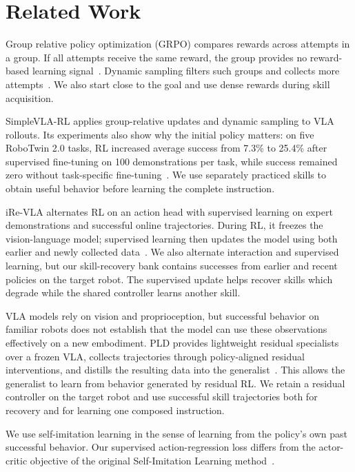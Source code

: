 \section{Related Work}\label{sec:related}
Group relative policy optimization (GRPO) compares rewards across attempts in a group. If all attempts receive the same reward, the group provides no reward-based learning signal~\cite{deepseekmath}. Dynamic sampling filters such groups and collects more attempts~\cite{dapo}. We also start close to the goal and use dense rewards during skill acquisition.

SimpleVLA-RL applies group-relative updates and dynamic sampling to VLA rollouts. Its experiments also show why the initial policy matters: on five RoboTwin 2.0 tasks, RL increased average success from 7.3\% to 25.4\% after supervised fine-tuning on 100 demonstrations per task, while success remained zero without task-specific fine-tuning~\cite{simplevlarl}. We use separately practiced skills to obtain useful behavior before learning the complete instruction.

iRe-VLA alternates RL on an action head with supervised learning on expert demonstrations and successful online trajectories. During RL, it freezes the vision-language model; supervised learning then updates the model using both earlier and newly collected data~\cite{irevla}. We also alternate interaction and supervised learning, but our skill-recovery bank contains successes from earlier and recent policies on the target robot. The supervised update helps recover skills which degrade while the shared controller learns another skill.

VLA models rely on vision and proprioception, but successful behavior on familiar robots does not establish that the model can use these observations effectively on a new embodiment. PLD provides lightweight residual specialists over a frozen VLA, collects trajectories through policy-aligned residual interventions, and distills the resulting data into the generalist~\cite{pld}. This allows the generalist to learn from behavior generated by residual RL. We retain a residual controller on the target robot and use successful skill trajectories both for recovery and for learning one composed instruction.

We use self-imitation learning in the sense of learning from the policy's own past successful behavior. Our supervised action-regression loss differs from the actor-critic objective of the original Self-Imitation Learning method~\cite{oh2018}.
